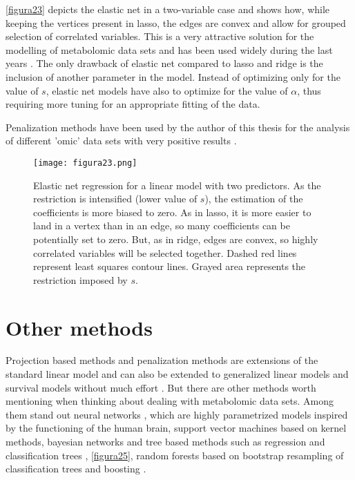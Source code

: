 \vspace{10pt}

\autoref{figura23} depicts the elastic net in a two-variable case and shows how, while keeping the vertices present in lasso, the edges are convex and allow for grouped selection of correlated variables. This is a very attractive solution for the modelling of metabolomic data sets and has been used widely during the last years \parencite{lankinen2010dietary, bowling2014analyzing, liu2015high, ferrario2016mortality}. The only drawback of elastic net compared to lasso and ridge is the inclusion of another parameter in the model. Instead of optimizing only for the value of $s$, elastic net models have also to optimize for the value of $\alpha$, thus requiring more tuning for an appropriate fitting of the data. 

Penalization methods have been used by the author of this thesis for the analysis of different 'omic' data sets with very positive results \parencite{yanez2015two, gonzalez2017prognostic, 10.1371/journal.pone.0202926}.

\begin{figure}[hbtp]
\centering
\texttt{[image: figura23.png]}
\caption[Elastic net regression for a linear model with two predictors]{Elastic net regression for a linear model with two predictors. As the restriction is intensified (lower value of $s$), the estimation of the coefficients is more biased to zero. As in lasso, it is more easier to land in a vertex than in an edge, so many coefficients can be potentially set to zero. But, as in ridge, edges are convex, so highly correlated variables will be selected together. Dashed red lines represent least squares contour lines. Grayed area represents the restriction imposed by $s$.}
\label{figura23}
\end{figure}

\section{Other methods}
Projection based methods and penalization methods are extensions of the standard linear model and can also be extended to generalized linear models and survival models without much effort \parencite{nygaard2008partial, simon2011regularization}. But there are other methods worth mentioning when thinking about dealing with metabolomic data sets. Among them stand out neural networks \parencite{dayhoff2001artificial}, which are highly parametrized models inspired by the functioning of the human brain, support vector machines \parencite{mahadevan2008analysis} based on kernel methods, bayesian networks \parencite{bartel2013statistical} and tree based methods such as regression and classification trees \parencite{venables2002tree, loh2014fifty}, \autoref{figura25}, random forests \parencite{breiman2001random} based on bootstrap resampling \parencite{efron1994introduction} of classification trees and boosting \parencite{freund1996experiments, auret2011empirical}.

